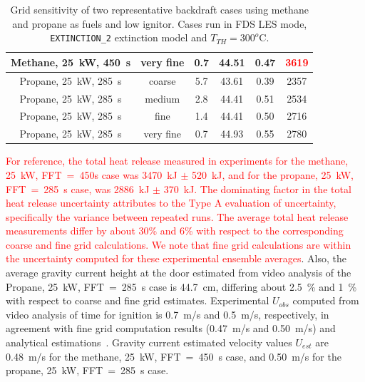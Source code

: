 \documentclass[12pt,letterpaper]{article}
\begin{document}
\begin{flushleft}
\begin{table}[]
\begin{tabular}{c|c|c|c|c|c}
    Methane, 25~kW, 450~s & very fine &           0.7 &      44.51        &     0.47      &  \textcolor{red}{3619}         \\ %
    \hline
    Propane, 25~kW, 285~s & coarse   &           5.7 &      43.61         &    0.39       &   2357   \\ %
    Propane, 25~kW, 285~s & medium   &           2.8 &      44.41         &    0.51       &   2534   \\ %
    Propane, 25~kW, 285~s & fine     &           1.4 &      44.41         &    0.50       &   2716   \\ %
    Propane, 25~kW, 285~s & very fine &           0.7 &      44.93         &    0.55       &   2780   \\ %
    \hline
    \end{tabular}
    \caption{Grid sensitivity of two representative backdraft cases using methane and propane as fuels and low ignitor. Cases run in FDS LES mode, \texttt{EXTINCTION\_2} extinction model and $T_{TH}=300^o$C.}
    \label{tab:grid_sens}
\end{table}

\textcolor{red}{For reference, the total heat release measured in experiments for the methane, 25~kW, FFT~=~450s case was 3470~kJ $\pm$ 520~kJ, and for the propane, 25~kW, FFT~=~285~s case, was 2886~kJ $\pm$ 370~kJ. The dominating factor in the total heat release uncertainty attributes to the Type A evaluation of uncertainty, specifically the variance between repeated runs. The average total heat release measurements differ by about 30\% and 6\% with respect to the corresponding coarse and fine grid calculations. We note that fine grid calculations are within the uncertainty computed for these experimental ensemble averages}. Also, the average gravity current height at the door estimated from video analysis of the Propane, 25~kW, FFT~=~285~s case is 44.7~cm, differing about 2.5~\% and 1~\% with respect to coarse and fine grid estimates. Experimental $U_{obs}$ computed from video analysis of time for ignition is 0.7~m/s and 0.5~m/s, respectively, in agreement with fine grid computation results (0.47~m/s and 0.50~m/s) and analytical estimations~\cite{fleischmann1993backdraft}. Gravity current estimated velocity values $U_{est}$ are 0.48~m/s for the methane, 25~kW, FFT~=~450~s case, and 0.50~m/s for the propane, 25~kW, FFT~=~285~s case. 


\end{flushleft}
\end{document}
